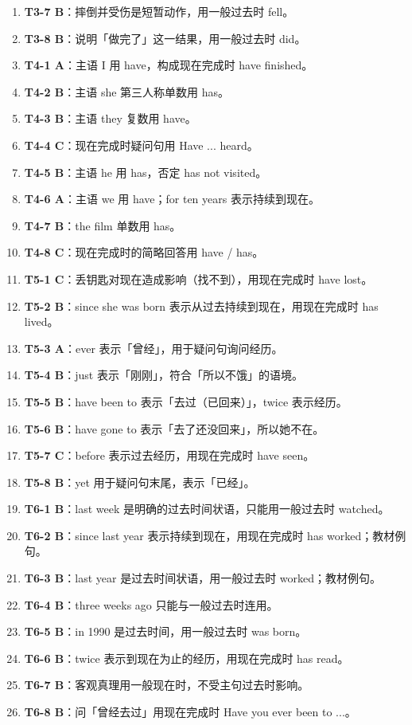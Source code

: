 \documentclass[11pt,a4paper]{ctexart}
\begin{document}
\begin{enumerate}[leftmargin=1.6em,itemsep=2pt]
\item \textbf{T3-7 B}：摔倒并受伤是短暂动作，用一般过去时 fell。
\item \textbf{T3-8 B}：说明「做完了」这一结果，用一般过去时 did。
\item \textbf{T4-1 A}：主语 I 用 have，构成现在完成时 have finished。
\item \textbf{T4-2 B}：主语 she 第三人称单数用 has。
\item \textbf{T4-3 B}：主语 they 复数用 have。
\item \textbf{T4-4 C}：现在完成时疑问句用 Have ... heard。
\item \textbf{T4-5 B}：主语 he 用 has，否定 has not visited。
\item \textbf{T4-6 A}：主语 we 用 have；for ten years 表示持续到现在。
\item \textbf{T4-7 B}：the film 单数用 has。
\item \textbf{T4-8 C}：现在完成时的简略回答用 have / has。
\item \textbf{T5-1 C}：丢钥匙对现在造成影响（找不到），用现在完成时 have lost。
\item \textbf{T5-2 B}：since she was born 表示从过去持续到现在，用现在完成时 has lived。
\item \textbf{T5-3 A}：ever 表示「曾经」，用于疑问句询问经历。
\item \textbf{T5-4 B}：just 表示「刚刚」，符合「所以不饿」的语境。
\item \textbf{T5-5 B}：have been to 表示「去过（已回来）」，twice 表示经历。
\item \textbf{T5-6 B}：have gone to 表示「去了还没回来」，所以她不在。
\item \textbf{T5-7 C}：before 表示过去经历，用现在完成时 have seen。
\item \textbf{T5-8 B}：yet 用于疑问句末尾，表示「已经」。
\item \textbf{T6-1 B}：last week 是明确的过去时间状语，只能用一般过去时 watched。
\item \textbf{T6-2 B}：since last year 表示持续到现在，用现在完成时 has worked；教材例句。
\item \textbf{T6-3 B}：last year 是过去时间状语，用一般过去时 worked；教材例句。
\item \textbf{T6-4 B}：three weeks ago 只能与一般过去时连用。
\item \textbf{T6-5 B}：in 1990 是过去时间，用一般过去时 was born。
\item \textbf{T6-6 B}：twice 表示到现在为止的经历，用现在完成时 has read。
\item \textbf{T6-7 B}：客观真理用一般现在时，不受主句过去时影响。
\item \textbf{T6-8 B}：问「曾经去过」用现在完成时 Have you ever been to ...。
\end{enumerate}
\end{document}
